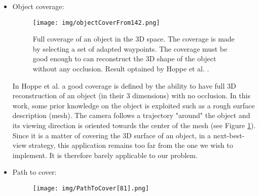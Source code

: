 %
%


\begin{itemize}
\item Object coverage: \\
\begin{figure}[t!]
\center
{}
   \texttt{[image: img/objectCoverFrom142.png]}
  \caption{Full coverage of an object in the 3D space. The coverage is made by selecting a set of adapted waypoints. The coverage must be good enough to can reconstruct the 3D shape of the object without any occlusion. Result optained by Hoppe et al. \cite{142*hoppe2012}.}\label{fig:ObjectCover142}
  \endminipage\hfill
\end{figure}
   In Hoppe et al. \cite{142*hoppe2012} a good coverage is defined by the ability to have full 3D reconstruction of an object (in their 3 dimensions) with no occlusion. In this work, some prior knowledge on the object is exploited such as a rough surface description (mesh). The camera follows a trajectory "around" the object and its viewing direction is oriented towards the center of the mesh (see Figure \ref{fig:ObjectCover142}). 
  Since it is a matter of covering the 3D surface of an object, in a next-best-view strategy, this application remains too far from the one we wish to implement.  It is therefore barely applicable to our problem. \\ 
   \item Path to cover: \\
   \begin{figure}[t!]
\center
{}
   \texttt{[image: img/PathToCover[81].png]}

\end{figure}
\end{itemize}
